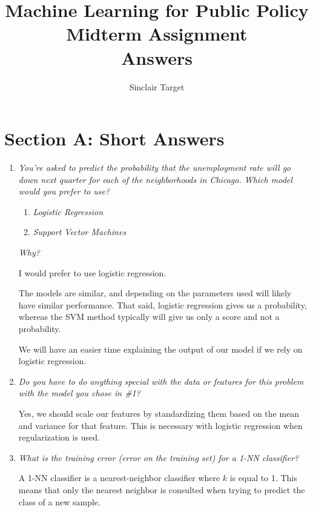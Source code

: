 \documentclass[11pt]{article}
\title{Machine Learning for Public Policy \\ Midterm Assignment \\ Answers}
\author{Sinclair Target}
\begin{document}
\maketitle

\section*{Section A: Short Answers}
\begin{enumerate}
    \item \textit{You're asked to predict the probability that the unemployment
        rate will go down next quarter for each of the neighborhoods in
        Chicago. Which model would you prefer to use?}

        \begin{enumerate}
            \item \textit{Logistic Regression}
            \item \textit{Support Vector Machines}
        \end{enumerate}

        \textit{Why?}

        I would prefer to use logistic regression.

        The models are similar, and depending on the parameters used will
        likely have similar performance. That said, logistic regression gives
        us a probability, whereas the SVM method typically will give us only a
        score and not a probability.

        We will have an easier time explaining the output of our model if we
        rely on logistic regression.

    \item \textit{Do you have to do anything special with the data or features
        for this problem with the model you chose in \#1?}

        Yes, we should scale our features by standardizing them based on the
        mean and variance for that feature. This is necessary with logistic
        regression when regularization is used.

    \item \textit{What is the training error (error on the training set) for a
        1-NN classifier?}

        A 1-NN classifier is a nearest-neighbor classifier where $k$ is equal
        to 1. This means that only the nearest neighbor is consulted when
        trying to predict the class of a new sample.


\end{enumerate}
\end{document}
